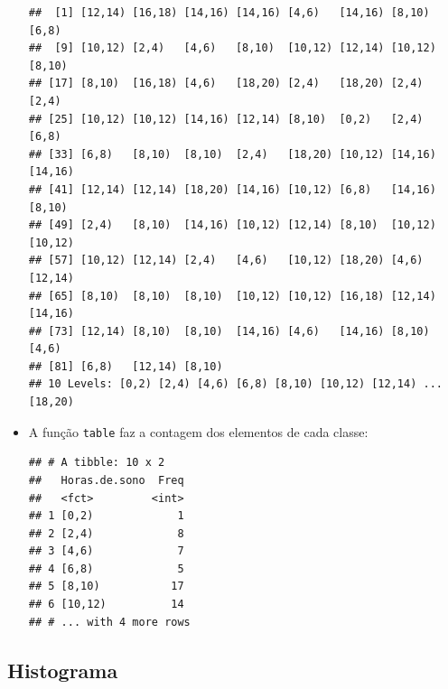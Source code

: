\documentclass[
  11pt]{report}
\newenvironment{Shaded}{\begin{snugshade}}{\end{snugshade}}
\newcommand{\AttributeTok}[1]{\textcolor[rgb]{0.77,0.63,0.00}{#1}}
\newcommand{\ConstantTok}[1]{\textcolor[rgb]{0.00,0.00,0.00}{#1}}
\newcommand{\DecValTok}[1]{\textcolor[rgb]{0.00,0.00,0.81}{#1}}
\newcommand{\FunctionTok}[1]{\textcolor[rgb]{0.00,0.00,0.00}{#1}}
\newcommand{\NormalTok}[1]{#1}
\newcommand{\SpecialCharTok}[1]{\textcolor[rgb]{0.00,0.00,0.00}{#1}}
\newcommand{\StringTok}[1]{\textcolor[rgb]{0.31,0.60,0.02}{#1}}
\renewenvironment{Shaded}{
    \begin{mdframed}[%
      roundcorner=2pt,%
      innerleftmargin=5pt,%
      innerrightmargin=5pt,%
      topline=true,%
      leftline=true,%
      rightline=true,%
      bottomline=true,%
      linewidth=0.5pt,%
      linecolor=black!20,%
      backgroundcolor=black!2,%
      skipabove=2ex,%
      skipbelow=2.5ex%
    ]%
  }
  {
    \end{mdframed}
  }
\begin{document}
\begin{itemize}
\begin{verbatim}
##  [1] [12,14) [16,18) [14,16) [14,16) [4,6)   [14,16) [8,10)  [6,8)  
##  [9] [10,12) [2,4)   [4,6)   [8,10)  [10,12) [12,14) [10,12) [8,10) 
## [17] [8,10)  [16,18) [4,6)   [18,20) [2,4)   [18,20) [2,4)   [2,4)  
## [25] [10,12) [10,12) [14,16) [12,14) [8,10)  [0,2)   [2,4)   [6,8)  
## [33] [6,8)   [8,10)  [8,10)  [2,4)   [18,20) [10,12) [14,16) [14,16)
## [41] [12,14) [12,14) [18,20) [14,16) [10,12) [6,8)   [14,16) [8,10) 
## [49] [2,4)   [8,10)  [14,16) [10,12) [12,14) [8,10)  [10,12) [10,12)
## [57] [10,12) [12,14) [2,4)   [4,6)   [10,12) [18,20) [4,6)   [12,14)
## [65] [8,10)  [8,10)  [8,10)  [10,12) [10,12) [16,18) [12,14) [14,16)
## [73] [12,14) [8,10)  [8,10)  [14,16) [4,6)   [14,16) [8,10)  [4,6)  
## [81] [6,8)   [12,14) [8,10) 
## 10 Levels: [0,2) [2,4) [4,6) [6,8) [8,10) [10,12) [12,14) ... [18,20)
\end{verbatim}
\item
  A função \texttt{table} faz a contagem dos elementos de cada classe:

\begin{Shaded}
\end{Shaded}

\begin{verbatim}
## # A tibble: 10 x 2
##   Horas.de.sono  Freq
##   <fct>         <int>
## 1 [0,2)             1
## 2 [2,4)             8
## 3 [4,6)             7
## 4 [6,8)             5
## 5 [8,10)           17
## 6 [10,12)          14
## # ... with 4 more rows
\end{verbatim}
\end{itemize}

\hypertarget{histograma}{%
\subsection{Histograma}\label{histograma}}
\end{document}
